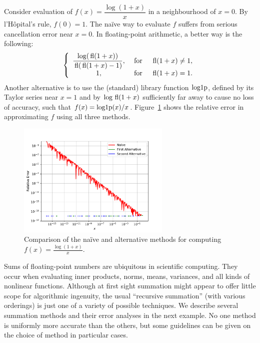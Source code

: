 \begin{example}
Consider evaluation of $f(x) = \dfrac{\log(1+x)}{x}$ in a neighbourhood of $x=0$. By l'H\^opital's rule, $f(0)=1$. The na\"ive way to evaluate $f$ suffers from serious cancellation error near $x=0$. In floating-point arithmetic, a better way is the following:
\[
\left\{ \begin{array}{ccc}
\dfrac{\log({\rm\,fl}(1+x))}{{\rm\,fl}({\rm\,fl}(1+x)-1)}, & \hbox{ for } & {\rm\,fl}(1+x)\ne 1,\\
1, & \hbox{ for } & {\rm\,fl}(1+x)=1.
\end{array}\right.
\]
Another alternative is to use the (standard) library function $\operatorname{log1p}$, defined by its Taylor series near $x=1$ and by $\log{\rm\,fl}(1+x)$ sufficiently far away to cause no loss of accuracy, such that $f(x) = \operatorname{log1p}(x)/x$. Figure~\ref{figure:log1pdx} shows the relative error in approximating $f$ using all three methods.
\begin{figure}[htbp]
\begin{center}
\includegraphics[width=0.65\textwidth]{log1pdx}
\caption{Comparison of the na\"ive and alternative methods for computing $f(x) = \frac{\log(1+x)}{x}$.}
\label{figure:log1pdx}
\end{center}
\end{figure}
\end{example}

Sums of floating-point numbers are ubiquitous in scientific computing. They occur when evaluating inner products, norms, means, variances, and all kinds of nonlinear functions. Although at first sight summation might appear to offer little scope for algorithmic ingenuity, the usual ``recursive summation'' (with various orderings) is just one of a variety of possible techniques. We describe several summation methods and their error analyses in the next example. No one method is uniformly more accurate than the others, but some guidelines can be given on the choice of method in particular cases.


